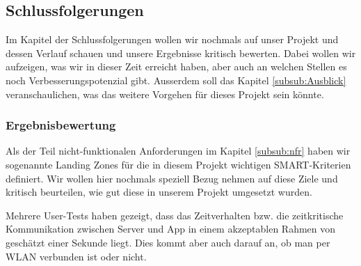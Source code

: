 \subsection{Schlussfolgerungen}
Im Kapitel der Schlussfolgerungen wollen wir nochmals auf unser Projekt und dessen Verlauf schauen und unsere Ergebnisse kritisch bewerten. Dabei wollen wir aufzeigen, was wir in dieser Zeit erreicht haben, aber auch an welchen Stellen es noch Verbesserungspotenzial gibt. Ausserdem soll das Kapitel \ref{subsub:Ausblick} veranschaulichen, was das weitere Vorgehen für dieses Projekt sein könnte.

\subsubsection{Ergebnisbewertung}
\label{subsec:ergebnisbewertung}


Als der Teil nicht-funktionalen Anforderungen im Kapitel \ref{subsub:nfr} haben wir sogenannte Landing Zones für die in diesem Projekt wichtigen SMART-Kriterien definiert. Wir wollen hier nochmals speziell Bezug nehmen auf diese Ziele und kritisch beurteilen, wie gut diese in unserem Projekt umgesetzt wurden.
 
 Mehrere User-Tests haben gezeigt, dass das Zeitverhalten bzw. die zeitkritische Kommunikation zwischen Server und App in einem akzeptablen Rahmen von geschätzt einer Sekunde liegt. Dies kommt aber auch darauf an, ob man per WLAN verbunden ist oder nicht. 
 
